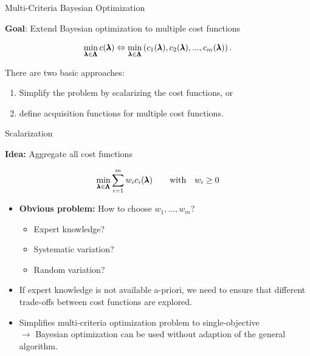 \begin{frame}{Multi-Criteria Bayesian Optimization}

\textbf{Goal}: Extend Bayesian optimization to multiple cost functions

$$
\min_{\pmb{\lambda} \in \pmb{\Lambda}}  c(\pmb{\lambda}) \Leftrightarrow \min_{\pmb{\lambda} \in \pmb{\Lambda}} \left(c_1(\pmb{\lambda}), c_2(\pmb{\lambda}), ..., c_m(\pmb{\lambda})\right).
$$


    \vspace{0.5cm}

There are two basic approaches:

\begin{enumerate}
        \item Simplify the problem by scalarizing the cost functions, or
        \item define acquisition functions for multiple cost functions.
\end{enumerate}

\end{frame}

\begin{frame}{Scalarization}

    \textbf{Idea:} Aggregate all cost functions


    $$\min_{\pmb{\lambda} \in \pmb{\Lambda}} \sum_{i = 1}^m w_i c_i(\pmb{\lambda}) \qquad \text{with} \quad w_i \ge 0 $$

    \begin{itemize}
        \item \textbf{Obvious problem:} How to choose $w_1, \dots, w_m$?
            \begin{itemize}
                \item Expert knowledge?
                \item Systematic variation?
                \item Random variation?
            \end{itemize}
        \item If expert knowledge is not available a-priori, we need to ensure that different trade-offs between cost functions are explored.
            \item Simplifies multi-criteria optimization problem to single-objective \\$\longrightarrow$ Bayesian optimization can be used without adaption of the general algorithm.
    \end{itemize}

\end{frame}

